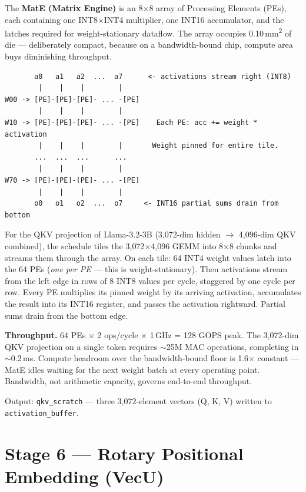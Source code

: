 \documentclass[11pt,letterpaper]{article}
\begin{document}
The \textbf{MatE (Matrix Engine)} is an 8$\times$8 array of Processing Elements (PEs), each
containing one INT8$\times$INT4 multiplier, one INT16 accumulator, and the latches required
for weight-stationary dataflow. The array occupies 0.10\,mm\textsuperscript{2} of die --- deliberately compact,
because on a bandwidth-bound chip, compute area buys diminishing throughput.

\begin{lstlisting}
       a0   a1   a2  ...  a7      <- activations stream right (INT8)
        |    |    |        |
W00 -> [PE]-[PE]-[PE]- ... -[PE]
        |    |    |        |
W10 -> [PE]-[PE]-[PE]- ... -[PE]    Each PE: acc += weight * activation
        |    |    |        |       Weight pinned for entire tile.
       ...  ...  ...      ...
        |    |    |        |
W70 -> [PE]-[PE]-[PE]- ... -[PE]
        |    |    |        |
       o0   o1   o2  ...  o7     <- INT16 partial sums drain from bottom
\end{lstlisting}

For the QKV projection of Llama-3.2-3B (3{,}072-dim hidden $\to$ 4{,}096-dim QKV combined),
the schedule tiles the 3{,}072$\times$4{,}096 GEMM into 8$\times$8 chunks and streams them
through the array. On each tile: 64 INT4 weight values latch into the 64 PEs (\emph{one per
PE} --- this is weight-stationary). Then activations stream from the left edge in rows of 8
INT8 values per cycle, staggered by one cycle per row. Every PE multiplies its pinned weight
by its arriving activation, accumulates the result into its INT16 register, and passes the
activation rightward. Partial sums drain from the bottom edge.

\textbf{Throughput.} 64 PEs $\times$ 2 ops/cycle $\times$ 1\,GHz = 128 GOPS peak. The
3{,}072-dim QKV projection on a single token requires $\sim$25M MAC operations, completing in
$\sim$0.2\,ms. Compute headroom over the bandwidth-bound floor is 1.6$\times$ constant ---
MatE idles waiting for the next weight batch at every operating point. Bandwidth, not
arithmetic capacity, governs end-to-end throughput.

Output: \texttt{qkv\_scratch} --- three 3{,}072-element vectors (Q, K, V) written to
\texttt{activation\_buffer}.

\section{Stage 6 --- Rotary Positional Embedding (VecU)}
\end{document}
